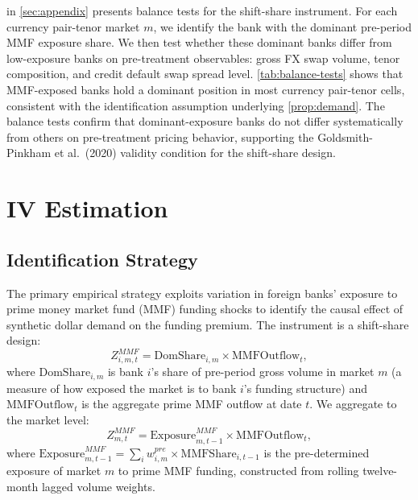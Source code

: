  in \cref{sec:appendix} presents balance tests for the
shift-share instrument. For each currency pair-tenor market $m$, we identify the
bank with the dominant pre-period MMF exposure share. We then test whether these
dominant banks differ from low-exposure banks on pre-treatment observables:
gross FX swap volume, tenor composition, and credit default swap spread level.
\cref{tab:balance-tests} shows that MMF-exposed banks hold a dominant
position in most currency pair-tenor cells, consistent with the identification
assumption underlying \cref{prop:demand}. The balance tests confirm that
dominant-exposure banks do not differ systematically from others on pre-treatment
pricing behavior, supporting the Goldsmith-Pinkham et al.\ (2020) validity
condition for the shift-share design.


\section{IV Estimation}
\label{sec:iv-results}

\subsection{Identification Strategy}
\label{subsec:identification}

The primary empirical strategy exploits variation in foreign banks' exposure to
prime money market fund (MMF) funding shocks to identify the causal effect of
synthetic dollar demand on the funding premium. The instrument is a shift-share
design:
\[
  Z_{i,m,t}^{MMF} = \text{DomShare}_{i,m} \times \text{MMFOutflow}_t,
\]
where $\text{DomShare}_{i,m}$ is bank $i$'s share of pre-period gross volume in
market $m$ (a measure of how exposed the market is to bank $i$'s funding
structure) and $\text{MMFOutflow}_t$ is the aggregate prime MMF outflow at date
$t$. We aggregate to the market level:
\[
  Z_{m,t}^{MMF} = \text{Exposure}^{MMF}_{m,t-1} \times \text{MMFOutflow}_t,
\]
where $\text{Exposure}^{MMF}_{m,t-1} = \sum_i w_{i,m}^{pre} \times
\text{MMFShare}_{i,t-1}$ is the pre-determined exposure of market $m$ to
prime MMF funding, constructed from rolling twelve-month lagged volume weights.

